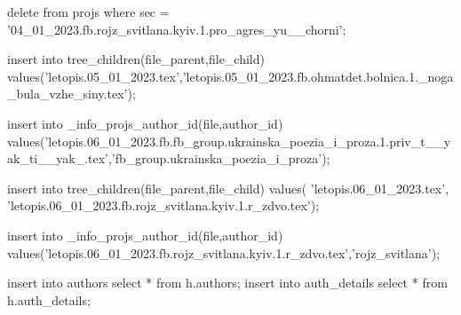  
 
 
 
 

delete from projs where sec = '04_01_2023.fb.rojz_svitlana.kyiv.1.pro_agres_yu__chorni';

insert into tree_children(file_parent,file_child) values('letopis.05_01_2023.tex','letopis.05_01_2023.fb.ohmatdet.bolnica.1._noga_bula_vzhe_siny.tex');

insert into _info_projs_author_id(file,author_id)
values('letopis.06_01_2023.fb.fb_group.ukrainska_poezia_i_proza.1.priv_t__yak_ti__yak_.tex','fb_group.ukrainska_poezia_i_proza');

insert into tree_children(file_parent,file_child) values(
'letopis.06_01_2023.tex',
'letopis.06_01_2023.fb.rojz_svitlana.kyiv.1.r_zdvo.tex');

insert into _info_projs_author_id(file,author_id)
values('letopis.06_01_2023.fb.rojz_svitlana.kyiv.1.r_zdvo.tex','rojz_svitlana');

insert into authors select * from h.authors;
insert into auth_details select * from h.auth_details;
